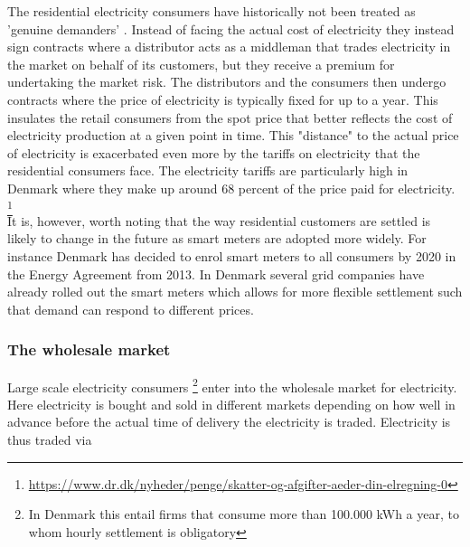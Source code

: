 The residential electricity consumers have historically not been treated as 'genuine demanders' \citep{kirschen2003demand}. Instead of facing the actual cost of electricity they instead sign contracts where a distributor acts as a middleman that trades electricity in the market on behalf of its customers, but they receive a premium for undertaking the market risk. The distributors and the consumers then undergo contracts where the price of electricity is typically fixed for up to a year. This insulates the retail consumers from the spot price that better reflects the cost of electricity production at a given point in time. This "distance" to the actual price of electricity is exacerbated even more by the tariffs on electricity that the residential consumers face. The electricity tariffs are particularly high in Denmark where they make up around 68 percent of the price paid for electricity. \footnote{\url{https://www.dr.dk/nyheder/penge/skatter-og-afgifter-aeder-din-elregning-0}} \smallskip \\ 

It is, however, worth noting that the way residential customers are settled is likely to change in the future as smart meters are adopted more widely. For instance Denmark has decided to enrol smart meters to all consumers by 2020 in the Energy Agreement from 2013. In Denmark several grid companies have already rolled out the smart meters which allows for more flexible settlement such that demand can respond to different prices. 

\subsubsection{The wholesale market}
\label{subsubsec: t_whomarket}
Large scale electricity consumers \footnote{In Denmark this entail firms that consume more than 100.000 kWh  a year, to whom hourly settlement is obligatory} enter into the wholesale market for electricity. Here electricity is bought and sold in different markets depending on how well in advance before the actual time of delivery the electricity is traded. Electricity is thus traded via 

